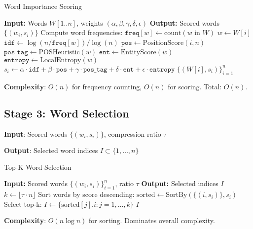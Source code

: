 \begin{algorithm}[H]
\caption{Word Importance Scoring}
\label{alg:scoring}
\begin{algorithmic}[1]
\STATE \textbf{Input:} Words $W[1..n]$, weights $(\alpha, \beta, \gamma, \delta, \epsilon)$
\STATE \textbf{Output:} Scored words $\{(w_i, s_i)\}$
\STATE Compute word frequencies: $\texttt{freq}[w] \gets \text{count}(w \text{ in } W)$
    \STATE $w \gets W[i]$
    \STATE $\texttt{idf} \gets \log(n / \texttt{freq}[w]) / \log(n)$
    \STATE $\texttt{pos} \gets \text{PositionScore}(i, n)$ 
    \STATE $\texttt{pos\_tag} \gets \text{POSHeuristic}(w)$ 
    \STATE $\texttt{ent} \gets \text{EntityScore}(w)$ 
    \STATE $\texttt{entropy} \gets \text{LocalEntropy}(w)$ 
    \STATE $s_i \gets \alpha \cdot \texttt{idf} + \beta \cdot \texttt{pos} + \gamma \cdot \texttt{pos\_tag} + \delta \cdot \texttt{ent} + \epsilon \cdot \texttt{entropy}$
\ENDFOR
\RETURN $\{(W[i], s_i)\}_{i=1}^{n}$
\end{algorithmic}
\end{algorithm}

\textbf{Complexity}: $O(n)$ for frequency counting, $O(n)$ for scoring. Total: $O(n)$.

\subsection{Stage 3: Word Selection}

\textbf{Input}: Scored words $\{(w_i, s_i)\}$, compression ratio $\tau$

\textbf{Output}: Selected word indices $I \subset \{1, \ldots, n\}$

\begin{algorithm}[H]
\caption{Top-K Word Selection}
\label{alg:selection}
\begin{algorithmic}[1]
\STATE \textbf{Input:} Scored words $\{(w_i, s_i)\}_{i=1}^{n}$, ratio $\tau$
\STATE \textbf{Output:} Selected indices $I$
\STATE $k \gets \lfloor \tau \cdot n \rfloor$
\STATE Sort words by score descending: $\text{sorted} \gets \text{SortBy}(\{(i, s_i)\}, s_i)$
\STATE Select top-k: $I \gets \{\text{sorted}[j].i : j = 1, \ldots, k\}$
\RETURN $I$
\end{algorithmic}
\end{algorithm}

\textbf{Complexity}: $O(n \log n)$ for sorting. Dominates overall complexity.

